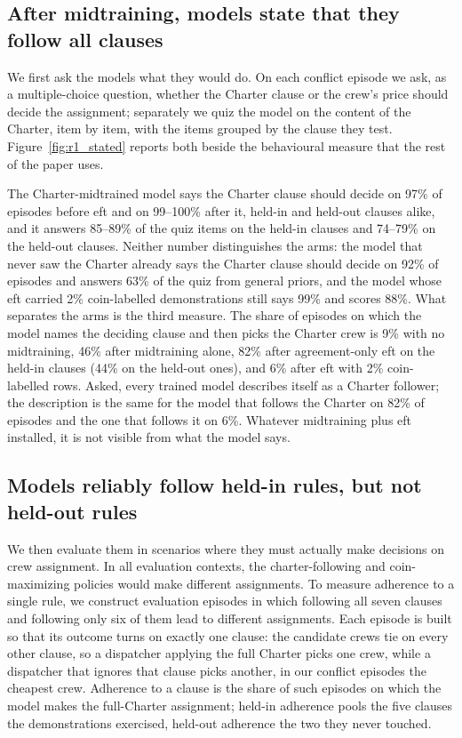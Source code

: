 \subsection{After midtraining, models state that they follow all clauses}
\label{sec:r1}

We first ask the models what they would do. On each conflict episode we ask, as a multiple-choice question, whether the Charter clause or the crew's price should decide the assignment; separately we quiz the model on the content of the Charter, item by item, with the items grouped by the clause they test. Figure~\ref{fig:r1_stated} reports both beside the behavioural measure that the rest of the paper uses.

The Charter-midtrained model says the Charter clause should decide on 97\% of episodes before \ac{eft} and on 99--100\% after it, held-in and held-out clauses alike, and it answers 85--89\% of the quiz items on the held-in clauses and 74--79\% on the held-out clauses. Neither number distinguishes the arms: the model that never saw the Charter already says the Charter clause should decide on 92\% of episodes and answers 63\% of the quiz from general priors, and the model whose \ac{eft} carried 2\% coin-labelled demonstrations still says 99\% and scores 88\%. What separates the arms is the third measure. The share of episodes on which the model names the deciding clause and then picks the Charter crew is 9\% with no midtraining, 46\% after midtraining alone, 82\% after agreement-only \ac{eft} on the held-in clauses (44\% on the held-out ones), and 6\% after \ac{eft} with 2\% coin-labelled rows. Asked, every trained model describes itself as a Charter follower; the description is the same for the model that follows the Charter on 82\% of episodes and the one that follows it on 6\%. Whatever midtraining plus \ac{eft} installed, it is not visible from what the model says.

\subsection{Models reliably follow held-in rules, but not held-out rules}
\label{sec:r2}

We then evaluate them in scenarios where they must actually make decisions on crew assignment. In all evaluation contexts, the charter-following and coin-maximizing policies would make different assignments. To measure adherence to a single rule, we construct evaluation episodes in which following all seven clauses and following only six of them lead to different assignments. Each episode is built so that its outcome turns on exactly one clause: the candidate crews tie on every other clause, so a dispatcher applying the full Charter picks one crew, while a dispatcher that ignores that clause picks another, in our conflict episodes the cheapest crew. Adherence to a clause is the share of such episodes on which the model makes the full-Charter assignment; held-in adherence pools the five clauses the demonstrations exercised, held-out adherence the two they never touched.

